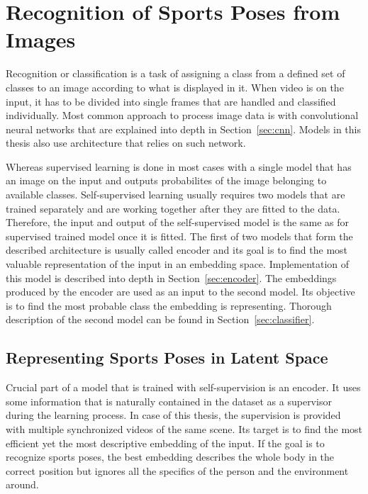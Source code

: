 \chapter{\label{chap:classification}Recognition of Sports Poses from Images}

Recognition or classification is a task of assigning a class from a defined set of classes to an image according to what is displayed in it. When video is on the input, it has to be divided into single frames that are handled and classified individually. Most common approach to process image data is with convolutional neural networks that are explained into depth in Section~\ref{sec:cnn}. Models in this thesis also use architecture that relies on such network.

Whereas supervised learning is done in most cases with a single model that has an image on the input and outputs probabilites of the image belonging to available classes. Self-supervised learning usually requires two models that are trained separately and are working together after they are fitted to the data. Therefore, the input and output of the self-supervised model is the same as for supervised trained model once it is fitted. The first of two models that form the described architecture is usually called encoder and its goal is to find the most valuable representation of the input in an embedding space. Implementation of this model is described into depth in Section~\ref{sec:encoder}. The embeddings produced by the encoder are used as an input to the second model. Its objective is to find the most probable class the embedding is representing. Thorough description of the second model can be found in Section~\ref{sec:classifier}.

\section{\label{sec:encoder}Representing Sports Poses in Latent Space}

Crucial part of a model that is trained with self-supervision is an encoder. It uses some information that is naturally contained in the dataset as a supervisor during the learning process. In case of this thesis, the supervision is provided with multiple synchronized videos of the same scene. Its target is to find the most efficient yet the most descriptive embedding of the input. If the goal is to recognize sports poses, the best embedding describes the whole body in the correct position but ignores all the specifics of the person and the environment around.

